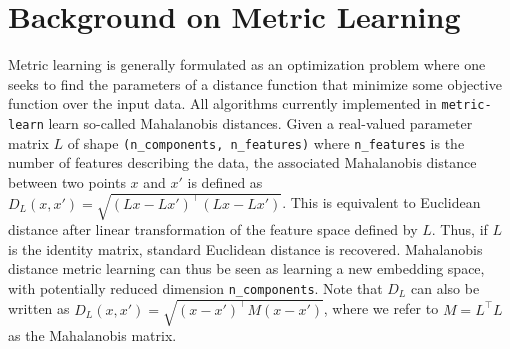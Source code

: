 \documentclass[twoside,11pt]{article}
\begin{document}
\section{Background on Metric Learning} \label{metriclearning}







Metric learning is generally formulated as an optimization problem where one seeks to find the parameters of a distance function that minimize some objective function over the input data.
All algorithms currently implemented in \texttt{metric-learn} learn so-called Mahalanobis distances. Given a real-valued parameter matrix $L$ of shape \texttt{(n\_components, n\_features)} where \texttt{n\_features} is the
number of features describing the data, the associated Mahalanobis distance between two points $x$ and $x'$ is defined as $D_L(x, x') = \sqrt{(Lx-Lx')^\top(Lx-Lx')}$.
This is equivalent to Euclidean distance after linear transformation of the feature space defined by $L$.
Thus, if $L$ is the identity matrix, standard Euclidean distance is recovered.
Mahalanobis distance metric learning can thus be seen as learning a new
embedding space, with potentially reduced dimension \texttt{n\_components}.
Note that $D_L$ can also be written as $D_L(x, x') = \sqrt{(x - x')^\top M (x - x')}$, where we refer to $M = L^\top L$ as the Mahalanobis matrix.
\end{document}
